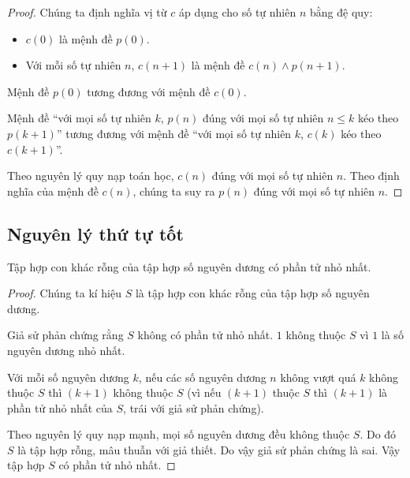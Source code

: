 \begin{proof}
	Chúng ta định nghĩa vị từ $c$ áp dụng cho số tự nhiên $n$ bằng đệ quy:
	\begin{itemize}
		\item $c(0)$ là mệnh đề $p(0)$.
		\item Với mỗi số tự nhiên $n$, $c(n+1)$ là mệnh đề $c(n)\wedge p(n+1)$.
	\end{itemize}

	Mệnh đề $p(0)$ tương đương với mệnh đề $c(0)$.

	Mệnh đề ``với mọi số tự nhiên $k$, $p(n)$ đúng với mọi số tự nhiên $n\leq k$ kéo theo $p(k+1)$'' tương đương với mệnh đề ``với mọi số tự nhiên $k$, $c(k)$ kéo theo $c(k+1)$''.

	Theo nguyên lý quy nạp toán học, $c(n)$ đúng với mọi số tự nhiên $n$. Theo định nghĩa của mệnh đề $c(n)$, chúng ta suy ra $p(n)$ đúng với mọi số tự nhiên $n$.
\end{proof}

\begin{theorem}
\end{theorem}

\begin{theorem}
\end{theorem}

\begin{theorem}
\end{theorem}

\subsection*{Nguyên lý thứ tự tốt}

\begin{theorem}
	Tập hợp con khác rỗng của tập hợp số nguyên dương có phần tử nhỏ nhất.
\end{theorem}

\begin{proof}
	Chúng ta kí hiệu $S$ là tập hợp con khác rỗng của tập hợp số nguyên dương.

	Giả sử phản chứng rằng $S$ không có phần tử nhỏ nhất. $1$ không thuộc $S$ vì $1$ là số nguyên dương nhỏ nhất.

	Với mỗi số nguyên dương $k$, nếu các số nguyên dương $n$ không vượt quá $k$ không thuộc $S$ thì $(k+1)$ không thuộc $S$ (vì nếu $(k+1)$ thuộc $S$ thì $(k+1)$ là phần tử nhỏ nhất của $S$, trái với giả sử phản chứng).

	Theo nguyên lý quy nạp mạnh, mọi số nguyên dương đều không thuộc $S$. Do đó $S$ là tập hợp rỗng, mâu thuẫn với giả thiết. Do vậy giả sử phản chứng là sai. Vậy tập hợp $S$ có phần tử nhỏ nhất.
\end{proof}

